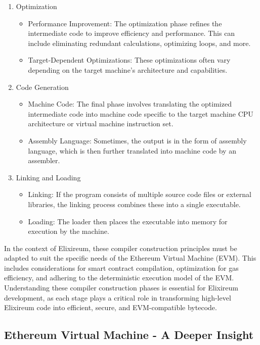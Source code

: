 \begin{enumerate}
\begin{itemize}
          \end{itemize}
    \item Optimization
          \begin{itemize}
              \item Performance Improvement: The optimization phase refines the intermediate code to improve efficiency and performance. This can include eliminating redundant calculations, optimizing loops, and more.
              \item Target-Dependent Optimizations: These optimizations often vary depending on the target machine's architecture and capabilities.
          \end{itemize}
    \item Code Generation
          \begin{itemize}
              \item Machine Code: The final phase involves translating the optimized intermediate code into machine code specific to the target machine CPU architecture or virtual machine instruction set.
              \item Assembly Language: Sometimes, the output is in the form of assembly language, which is then further translated into machine code by an assembler.
          \end{itemize}
    \item  Linking and Loading
          \begin{itemize}
              \item Linking: If the program consists of multiple source code files or external libraries, the linking process combines these into a single executable.
              \item Loading: The loader then places the executable into memory for execution by the machine.
          \end{itemize}
\end{enumerate}

In the context of Elixireum, these compiler construction principles must be adapted to suit the specific needs of the Ethereum Virtual Machine (EVM). This includes considerations for smart contract compilation, optimization for gas efficiency, and adhering to the deterministic execution model of the EVM. Understanding these compiler construction phases is essential for Elixireum development, as each stage plays a critical role in transforming high-level Elixireum code into efficient, secure, and EVM-compatible bytecode.

\subsection{Ethereum Virtual Machine - A Deeper Insight}

